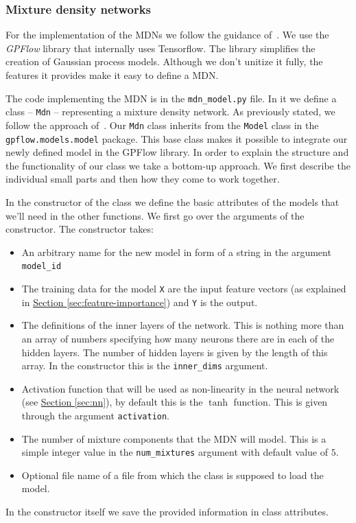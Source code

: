 \documentclass[12pt,a4paper,twoside]{scrartcl}
\numberwithin{equation}{section}
\newcommand{\refsec}[1]{\hyperref[#1]{Section \ref*{#1}}}
\begin{document}
\subsubsection{Mixture density networks}\label{sec:impl-mdn}
For the implementation of the MDNs we follow the guidance of~\cite{mdntut}. We use the \emph{GPFlow} library that internally uses Tensorflow. The library simplifies the creation of Gaussian process models. Although we don't unitize it fully, the features it provides make it easy to define a MDN.

The code implementing the MDN is in the \texttt{mdn\_model.py} file. In it we define a class -- \texttt{Mdn} -- representing a mixture density network. As previously stated, we follow the approach of~\cite{mdntut}. Our \texttt{Mdn} class inherits from the \texttt{Model} class in the \texttt{gpflow.models.model} package. This base class makes it possible to integrate our newly defined model in the GPFlow library. In order to explain the structure and the functionality of our class we take a bottom-up approach. We first describe the individual small parts and then how they come to work together.

In the constructor of the class we define the basic attributes of the models that we'll need in the other functions. We first go over the arguments of the constructor. The constructor takes:
\begin{itemize}
\item An arbitrary name for the new model in form of a string in the argument \texttt{model\_id}
\item The training data for the model \texttt{X} are the input feature vectors (as explained in \refsec{sec:feature-importance}) and \texttt{Y} is the output.
\item The definitions of the inner layers of the network. This is nothing more than an array of numbers specifying how many neurons there are in each of the hidden layers. The number of hidden layers is given by the length of this array. In the constructor this is the \texttt{inner\_dims} argument.
\item Activation function that will be used as non-linearity in the neural network (see \refsec{sec:nn}), by default this is the \(\tanh\) function. This is given through the argument \texttt{activation}.
\item The number of mixture components that the MDN will model. This is a simple integer value in the \texttt{num\_mixtures} argument with default value of \(5\).
\item Optional file name of a file from which the class is supposed to load the model.
\end{itemize}
In the constructor itself we save the provided information in class attributes.
\end{document}
